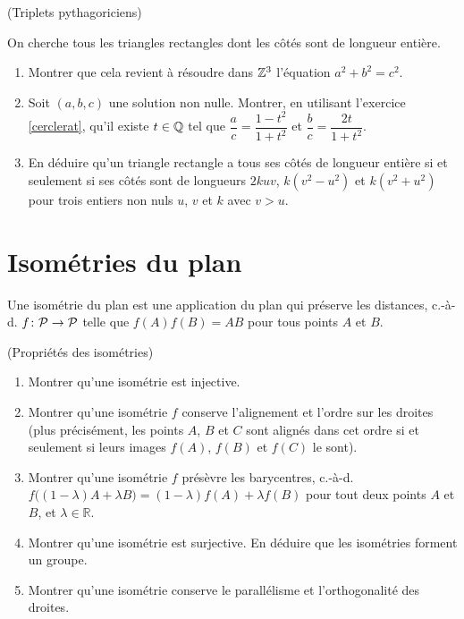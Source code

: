 \documentclass[a4paper,11pt,reqno]{amsart}
\begin{document}
\begin{exo} (Triplets pythagoriciens)

  On cherche tous les triangles rectangles dont les côtés sont de longueur entière.
  \begin{enumerate}
    \item Montrer que cela revient à résoudre dans $\mathbb{Z}^3$ l'équation $a^2+b^2=c^2$.
    \item Soit $(a,b,c)$ une solution non nulle. Montrer, en utilisant l'exercice \ref{cerclerat}, qu'il  existe $t \in \mathbb{Q}$ tel que $\dfrac{a}{c}= \dfrac{1-t^2}{1+t^2}$\; et\; $\dfrac{b}{c}= \dfrac{2t}{1+t^2}$.
    \item En déduire qu'un triangle rectangle a tous ses côtés de longueur entière si et seulement si ses côtés sont de longueurs $2kuv$, $k(v^2-u^2)$ et $k(v^2+u^2)$ pour trois entiers non nuls $u$, $v$ et $k$ avec $v>u$.
  \end{enumerate}
\end{exo}


\section{Isométries du plan}

\begin{convention}
  Une isométrie du plan est une application du plan qui préserve les distances, c.-à-d. $f \colon \mathcal{P} \to \mathcal{P}$ telle que $f(A)f(B)=AB$ pour tous points $A$ et $B$.
\end{convention}

\begin{exo} (Propriétés des isométries)

\begin{enumerate}
  \item Montrer qu'une isométrie est injective.
  \item Montrer qu'une isométrie $f$ conserve l'alignement et l'ordre sur les droites (plus précisément, les points $A$, $B$ et $C$ sont alignés dans cet ordre si et seulement si leurs images $f(A)$, $f(B)$ et $f(C)$ le sont).
  \item Montrer qu'une isométrie $f$ présèvre les barycentres, c.-à-d. $f\big((1- \lambda )A + \lambda B\big) = (1- \lambda )f(A) + \lambda f(B)$ pour tout deux points $A$ et $B$, et $\lambda \in \mathbb{R}$.
  \item Montrer qu'une isométrie est surjective. En déduire que les isométries forment un groupe.
  \item Montrer qu'une isométrie conserve le parallélisme et l'orthogonalité des droites.
\end{enumerate}
\end{exo}
\end{document}
